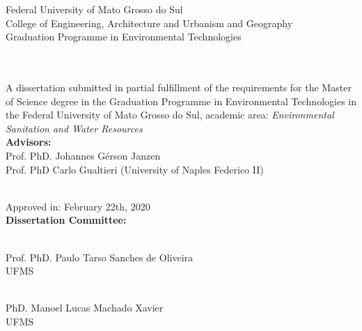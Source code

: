 \begin{center}
    \large Federal University of Mato Grosso do Sul\\
    \large College of Engineering, Architecture and Urbanism and Geography\\
    \large Graduation Programme in Environmental Technologies
    \\[1.5\baselineskip]
    \large\theauthor
    \\[1.5\baselineskip]
    \uppercase{\Large\thetitle}
    \\[1\baselineskip]
\end{center}
\hfill
\begin{minipage}{0.5\textwidth}
A dissertation submitted in partial fulfillment of the requirements for the Master of Science degree in the Graduation Programme in Environmental Technologies in the Federal University of Mato Grosso do Sul, academic area: \textit{Environmental Sanitation and Water Resources}
\\[0.5\baselineskip]
\textbf{Advisors:}\\Prof. PhD. Johannes Gérson Janzen\\
Prof. PhD Carlo Gualtieri (University of Naples Federico II)
\end{minipage}
\\[1\baselineskip]
Approved in: February 22th, 2020
\\[0.5\baselineskip]
\textbf{Dissertation Committee:}
\\[4.5\baselineskip]
\begin{minipage}{0.5\textwidth}
    \begin{center}
    \begin{minipage}{7cm}
        \hrulefill
    \end{minipage}\\
    Prof. PhD. Paulo Tarso Sanches de Oliveira\\
    UFMS
    \end{center}
\end{minipage}
\hfill
\begin{minipage}{0.5\textwidth}
    \begin{center}
    \begin{minipage}{7cm}
        \hrulefill
    \end{minipage}\\
    PhD. Manoel Lucas Machado Xavier\\
    UFMS
    \end{center}
\end{minipage}
\vfill{}
\begin{center}
    \thedate
\end{center}
